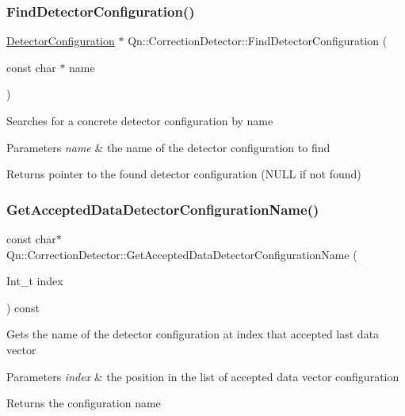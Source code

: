 \subsubsection{\texorpdfstring{Find\+Detector\+Configuration()}{FindDetectorConfiguration()}}
{\footnotesize\ttfamily \mbox{\hyperlink{classQn_1_1DetectorConfiguration}{Detector\+Configuration}} $\ast$ Qn\+::\+Correction\+Detector\+::\+Find\+Detector\+Configuration (\begin{DoxyParamCaption}\item[{const char $\ast$}]{name }\end{DoxyParamCaption})}

Searches for a concrete detector configuration by name 
\begin{DoxyParams}{Parameters}
{\em name} & the name of the detector configuration to find \\
\hline
\end{DoxyParams}
\begin{DoxyReturn}{Returns}
pointer to the found detector configuration (N\+U\+LL if not found) 
\end{DoxyReturn}
\mbox{\label{classQn_1_1CorrectionDetector_a02acf1eeed47ab5eb2df84ae1de57b59}} 
\subsubsection{\texorpdfstring{Get\+Accepted\+Data\+Detector\+Configuration\+Name()}{GetAcceptedDataDetectorConfigurationName()}}
{\footnotesize\ttfamily const char$\ast$ Qn\+::\+Correction\+Detector\+::\+Get\+Accepted\+Data\+Detector\+Configuration\+Name (\begin{DoxyParamCaption}\item[{Int\+\_\+t}]{index }\end{DoxyParamCaption}) const\hspace{0.3cm}{\ttfamily [inline]}}

Gets the name of the detector configuration at index that accepted last data vector 
\begin{DoxyParams}{Parameters}
{\em index} & the position in the list of accepted data vector configuration \\
\hline
\end{DoxyParams}
\begin{DoxyReturn}{Returns}
the configuration name 
\end{DoxyReturn}
\mbox{\label{classQn_1_1CorrectionDetector_a8f3d562c17ea64048e7830683387588c}} 
